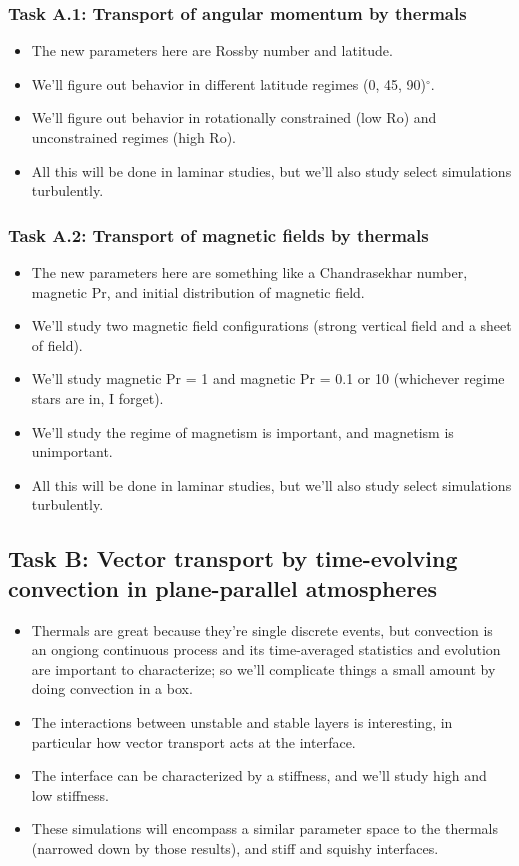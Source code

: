 \documentclass[aasms,12pt]{article}
\begin{document}
\subsubsection{Task A.1: Transport of angular momentum by thermals}
\begin{itemize}
\item The new parameters here are Rossby number and latitude.
\item We'll figure out behavior in different latitude regimes (0, 45, 90)$^{\circ}$.
\item We'll figure out behavior in rotationally constrained (low Ro) and unconstrained regimes (high Ro).
\item All this will be done in laminar studies, but we'll also study select simulations turbulently.
\end{itemize}

\subsubsection{Task A.2: Transport of magnetic fields by thermals}
\begin{itemize}
\item The new parameters here are something like a Chandrasekhar number, magnetic Pr, and initial distribution of magnetic field.
\item We'll study two magnetic field configurations (strong vertical field and a sheet of field).
\item We'll study magnetic Pr = 1 and magnetic Pr = 0.1 or 10 (whichever regime stars are in, I forget).
\item We'll study the regime of magnetism is important, and magnetism is unimportant.
\item All this will be done in laminar studies, but we'll also study select simulations turbulently.
\end{itemize}


\subsection{Task B: Vector transport by time-evolving convection in plane-parallel atmospheres}
\begin{itemize}
\item Thermals are great because they're single discrete events, but convection is an ongiong continuous process and its time-averaged statistics and evolution are important to characterize; so we'll complicate things a small amount by doing convection in a box.
\item The interactions between unstable and stable layers is interesting, in particular how vector transport acts at the interface.
\item The interface can be characterized by a stiffness, and we'll study high and low stiffness.
\item These simulations will encompass a similar parameter space to the thermals (narrowed down by those results), and stiff and squishy interfaces.
\end{itemize}
\end{document}
